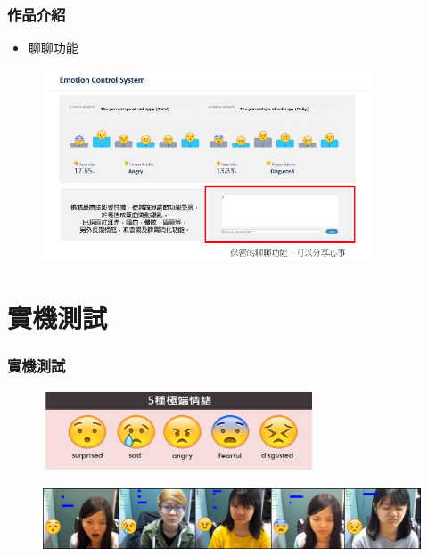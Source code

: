 \documentclass[10pt, conference, compsocconf]{beamer}
\begin{document}
\begin{CJK}{UTF8}{}
\begin{frame}
\end{frame}

\begin{frame}
\frametitle{作品介紹}
\begin{itemize}
\item \Large 聊聊功能
\end{itemize}

\begin{figure}[!t]
\begin{center}
\includegraphics[width=9.7cm]{./Figures/web4.pdf}
\end{center}
\end{figure}

\end{frame}

\section{實機測試}

\begin{frame}
\frametitle{實機測試}

\vspace{-5mm}
\begin{figure}[t]
\begin{center}
\includegraphics[width=8cm]{./Figures/508.jpg}
\end{center}
\end{figure}

\vspace{5mm}
\begin{figure}[!t]
\begin{center}
\includegraphics[width=12cm]{./Figures/509.jpg}
\end{center}
\end{figure}


\end{frame}
\end{CJK}
\end{document}
